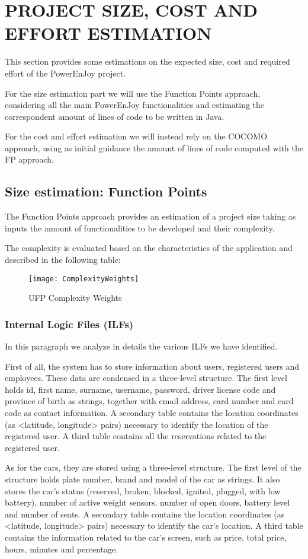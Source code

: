 \section{PROJECT SIZE, COST AND EFFORT ESTIMATION}
This section provides some estimations on the expected size, cost and required effort of the PowerEnJoy project.

For the size estimation part we will use the Function Points approach, considering all the main PowerEnJoy functionalities and estimating the correspondent amount of lines of code to be written in Java. 

For the cost and effort estimation we will instead rely on the COCOMO approach, using as initial guidance the amount of lines of code computed with the FP approach.

\subsection{Size estimation: Function Points}
The Function Points approach provides an estimation of a project size taking as inputs the amount of functionalities to be developed and their complexity.

The complexity is evaluated based on the characteristics of the application and described in the following table:

\begin{figure}[H]
	\centering
	\texttt{[image: ComplexityWeights]}
	\caption{UFP Complexity Weights}
\end{figure}
\newpage
\subsubsection{Internal Logic Files (ILFs)}
In this paragraph we analyze in details the various ILFs we have identified.

First of all, the system has to store information about users, registered users and employees. These data are condensed in a three-level structure. The first level holds id, first name, surname, username, password, driver license code and province of birth as strings, together with email address, card number and card code as contact information. A secondary table contains the location coordinates (as <latitude, longitude> pairs) necessary to identify the location of the registered user. A third table contains all the reservations related to the registered user.

As for the cars, they are stored using a three-level structure. The first level of the structure holds plate number, brand and model of the car as strings. It also stores the car’s status (reserved, broken, blocked, ignited, plugged, with low battery), number of active weight sensors, number of open doors, battery level and number of seats. A secondary table contains the location coordinates (as <latitude, longitude> pairs) necessary to identify the car's location. A third table contains the information related to the car's screen, such as price, total price, hours, minutes and percentage.

